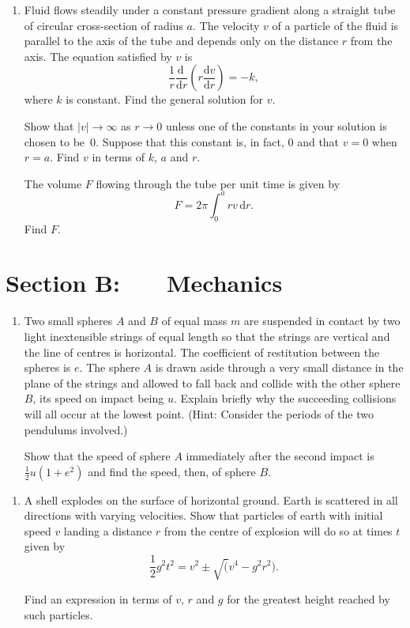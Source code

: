 \documentclass[a4, 11pt]{report}
\newlength{\qspace}
\newcounter{qnumber}
\newenvironment{question}%
 {\vspace{\qspace}
  \begin{enumerate}[\bfseries 1\quad][10]%
    \setcounter{enumi}{\value{qnumber}}%
    \item%
 }
{
  \end{enumerate}
  \filbreak
  \stepcounter{qnumber}
 }
\begin{document}
\begin{question}	
Fluid flows steadily under a constant pressure
gradient along a straight tube of circular 
cross-section of radius $a$. The velocity $v$
of a particle of the fluid is parallel to the axis of the tube 
and depends only on the distance $r$
from the axis. The equation satisfied by $v$ is
\[\frac{1}{r}\frac{{\mathrm d}\ }{{\mathrm d}r}
\left(r\frac{{\mathrm d}v}{{\mathrm d}r}\right)
=-k,\]
where $k$ is constant. 
Find the general solution for $v$. 

Show that $|v|\rightarrow\infty$ as $r\rightarrow 0$ 
unless one of the constants in your solution 
is chosen to be~$0$.
Suppose that this constant is, in fact, $0$ and
that $v=0$ when $r=a$.
Find $v$ in terms of $k$, $a$ and $r$. 

The volume $F$ flowing through the tube
per unit time is given by
\[F=2\pi\int_{0}^{a}rv\,{\mathrm d}r.
\]
Find $F$.
\end{question}	
		

		
	
\newpage
\section*{Section B: \ \ \ Mechanics}


	
\begin{question}
Two small spheres $A$ and $B$ of equal mass $m$
are suspended in contact by two light inextensible strings
of equal length so that
the strings are vertical and
the line of centres is horizontal.
The coefficient of restitution between the spheres is $e$.
The sphere $A$ is
drawn aside through a very small distance
in the plane of the strings
and allowed
to fall back and collide with the other sphere $B$, its speed
on impact being $u$.
Explain briefly why the succeeding collisions will all occur
at the lowest point. (Hint: Consider the periods of the
two pendulums involved.)

Show that the speed of sphere $A$
immediately after the second impact is 
$\frac{1}{2}u(1+e^{2})$
and find the speed, then, of sphere $B$.

	\end{question}
	
\begin{question}	
A shell explodes on the surface of horizontal ground.
Earth is scattered in all directions with varying velocities.
Show that particles of earth with initial speed $v$
landing a  distance $r$ from the centre of explosion
will do so at times $t$ given by
\[
{\textstyle \frac{1}{2}}
g^2t^2=v^{2}\pm\surd(v^{4}-g^{2}r^{2}).
\]

Find an expression in terms of $v$, $r$ and $g$ for 
the greatest height reached by such particles.

\end{question}
\end{document}
